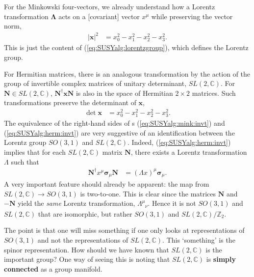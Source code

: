 \documentclass[12pt]{article}
\numberwithin{equation}{section}    %
\begin{document}
For the Minkowski four-vectors, we already understand how a Lorentz transformation $\mathbf \Lambda$ acts on a [covariant] vector $x^\mu$ while preserving the vector norm,   
\begin{align}
	|\mathbf x |^2 &= x_0^2 - x_1^2 - x_2^2 - x_3^2.\label{eq:SUSYalg:mink:invt}
\end{align}
This is just the content of  (\ref{eq:SUSYalg:lorentzgroup}), which defines the Lorentz group.

For Hermitian matrices, there is an analogous transformation by the action of the group of invertible complex matrices of unitary determinant, $SL(2,\mathbb C)$. For $\mathbf N \in SL(2,\mathbb C)$, $\mathbf N^\dag \mathbf{x} \mathbf N$
is also in the space of Hermitian $2\times 2$ matrices. Such transformations preserve the determinant of $\mathbf x$,
\begin{align}
	\det \mathbf{x} &= x_0^2 - x_1^2 - x_2^2 - x_3^2.\label{eq:SUSYalg:herm:invt}
\end{align}
The equivalence of the right-hand sides of s (\ref{eq:SUSYalg:mink:invt}) and (\ref{eq:SUSYalg:herm:invt}) are very suggestive of an identification between the Lorentz group $SO(3,1)$ and $SL(2,\mathbb C)$. Indeed,  (\ref{eq:SUSYalg:herm:invt}) implies that for each $SL(2,\mathbb C)$ matrix $\mathbf N$, there exists a Lorentz transformation $\Lambda$ such that 
\begin{align}
	\mathbf{N^\dag} x^\mu \mathbf{\sigma}_\mu \mathbf{N} &= (\Lambda x)^\mu \mathbf{\sigma}_\mu.\label{eq:SUSYalg:SL2C:Lorentz}
\end{align}
A very 
important feature should already be apparent: the map from $SL(2,\mathbb C)\rightarrow SO(3,1)$ is two-to-one. This is clear since the matrices $\mathbf N$ and $-\mathbf N$ yield the \textit{same} Lorentz transformation, $\Lambda^\mu_{\phantom\mu\nu}$. Hence it is not $SO(3,1)$ and $SL(2,\mathbb C)$ that are isomorphic, but rather $SO(3,1)$ and $SL(2,\mathbb C)/\mathbb Z_2$.

The point is that one will miss something if one only looks at representations of $SO(3,1)$ and not the representations of $SL(2,\mathbb C)$. This `something' is the spinor representation. How should we have known that $SL(2,\mathbb C)$ is the important group? One way of seeing this is noting that $SL(2,\mathbb C)$ is \textbf{simply connected} as a group manifold.
\end{document}
